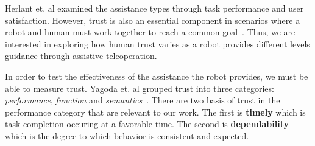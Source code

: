 Herlant et. al examined the assistance types through task performance and user satisfaction. However, trust is also an essential component in scenarios where a robot and human must work together to reach a common goal~\cite{atkinson2014shared}. Thus, we are interested in exploring how human trust varies as a robot provides different levels guidance through assistive teleoperation. 

In order to test the effectiveness of the assistance the robot provides, we must be able to measure trust. Yagoda et. al grouped trust into three categories: \textit{performance}, \textit{function} and \textit{semantics}~\cite{yagoda2012you}. There are two basis of trust in the performance category that are relevant to our work. The first is \textbf{timely} which is task completion occuring at a favorable time. The second is \textbf{dependability} which is the degree to which behavior is consistent and expected. 
